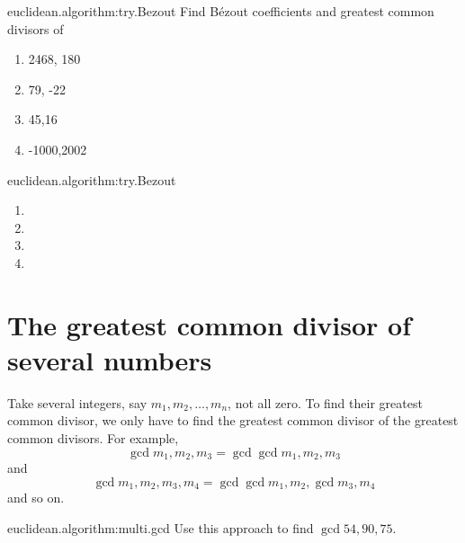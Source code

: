 \begin{problem}{euclidean.algorithm:try.Bezout}
Find B\'ezout coefficients and greatest common divisors of
\begin{enumerate}
\item 2468, 180
\item 79, -22
\item 45,16
\item -1000,2002
\end{enumerate}
\end{problem}
\begin{answer}{euclidean.algorithm:try.Bezout}
\begin{enumerate}
\item
{}
\item
{}
\item
{}
\item
{}
\end{enumerate}
\end{answer}


\section{The greatest common divisor of several numbers}
Take several integers, say \(m_1, m_2, \dots, m_n\), not all zero.
To find their greatest common divisor, we only have to find the greatest common divisor of the greatest common divisors.
For example,
\[
\gcd{m_1, m_2, m_3}
=\gcd{\gcd{m_1, m_2}, m_3}
\]
and
\[
\gcd{m_1, m_2, m_3,m_4}
=\gcd{\gcd{m_1, m_2}, \gcd{m_3,m_4}}
\]
and so on.

\begin{problem}{euclidean.algorithm:multi.gcd}
Use this approach to find \(\gcd{54,90,75}\).
\end{problem}



